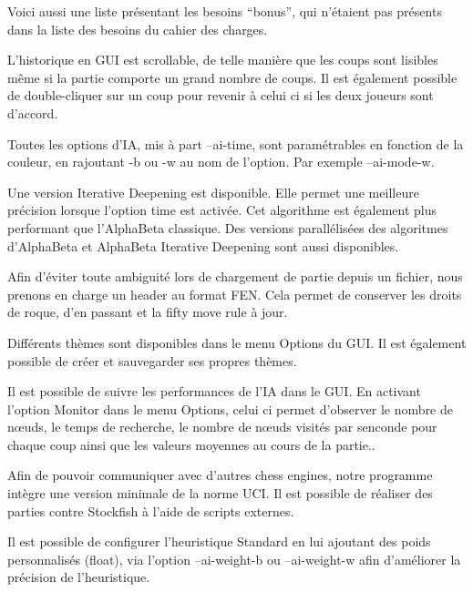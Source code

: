 \documentclass{article}
\begin{document}
Voici aussi une liste présentant les besoins ``bonus'', qui n'étaient pas présents dans la liste des besoins du cahier des charges.

\begin{needbox}
    L'historique en GUI est scrollable, de telle manière que les coups sont lisibles même si la partie
    comporte un grand nombre de coups. Il est également possible de double-cliquer sur un coup pour revenir à celui ci si les deux joueurs sont d'accord.
\end{needbox}

\begin{needbox}[F62: IA paramétrable]
   Toutes les options d'IA, mis à part --ai-time, sont paramétrables en fonction de la couleur, en rajoutant 
   -b ou -w au nom de l'option. Par exemple --ai-mode-w.
\end{needbox}

\begin{needbox}
   Une version Iterative Deepening est disponible. Elle permet une meilleure précision lorsque l'option time est activée. Cet algorithme est également plus performant que l'AlphaBeta classique.
   Des versions parallélisées des algoritmes d'AlphaBeta et AlphaBeta Iterative Deepening sont aussi disponibles.
\end{needbox}

\begin{needbox}
   Afin d'éviter toute ambiguité lors de chargement de partie depuis un fichier, nous prenons en charge un header au format FEN. Cela permet de conserver les droits de roque, d'en passant et la fifty move rule à jour.
\end{needbox}

\begin{needbox}
    Différents thèmes sont disponibles dans le menu Options du GUI. Il est également possible de créer et sauvegarder ses propres thèmes.
\end{needbox}

\begin{needbox}[F66: Monitoring de l'IA]
    Il est possible de suivre les performances de l'IA dans le GUI. En activant l'option Monitor dans le menu Options, celui ci permet d'observer le nombre de nœuds, le temps de recherche, le nombre de nœuds visités par senconde pour chaque coup ainsi que les valeurs moyennes au cours de la partie..
\end{needbox}

\begin{needbox}
    Afin de pouvoir communiquer avec d'autres chess engines, notre programme intègre une version minimale de la norme UCI. Il est possible de réaliser des parties contre Stockfish à l'aide de scripts externes.
\end{needbox}

\begin{needbox}
    Il est possible de configurer l'heuristique Standard en lui ajoutant des poids personnalisés (float), via l'option --ai-weight-b ou --ai-weight-w afin d'améliorer la précision de l'heuristique.
\end{needbox}
\end{document}
